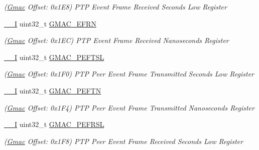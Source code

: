 \begin{DoxyCompactItemize}
\begin{DoxyCompactList}\small\item\em (\mbox{\hyperlink{structGmac}{Gmac}} Offset\+: 0x1\+E8) P\+TP Event Frame Received Seconds Low Register \end{DoxyCompactList}\item 
\mbox{\label{structGmac_a8b25b027a206d3d56ae3e32079a1b18f}} 
\mbox{\hyperlink{core__cm7_8h_af63697ed9952cc71e1225efe205f6cd3}{\+\_\+\+\_\+I}} uint32\+\_\+t \mbox{\hyperlink{structGmac_a8b25b027a206d3d56ae3e32079a1b18f}{G\+M\+A\+C\+\_\+\+E\+F\+RN}}
\begin{DoxyCompactList}\small\item\em (\mbox{\hyperlink{structGmac}{Gmac}} Offset\+: 0x1\+EC) P\+TP Event Frame Received Nanoseconds Register \end{DoxyCompactList}\item 
\mbox{\label{structGmac_a212ed4d07957cad7923c9a79aa84df51}} 
\mbox{\hyperlink{core__cm7_8h_af63697ed9952cc71e1225efe205f6cd3}{\+\_\+\+\_\+I}} uint32\+\_\+t \mbox{\hyperlink{structGmac_a212ed4d07957cad7923c9a79aa84df51}{G\+M\+A\+C\+\_\+\+P\+E\+F\+T\+SL}}
\begin{DoxyCompactList}\small\item\em (\mbox{\hyperlink{structGmac}{Gmac}} Offset\+: 0x1\+F0) P\+TP Peer Event Frame Transmitted Seconds Low Register \end{DoxyCompactList}\item 
\mbox{\label{structGmac_a4e28c5644dac1d89b934530f1f7a21c3}} 
\mbox{\hyperlink{core__cm7_8h_af63697ed9952cc71e1225efe205f6cd3}{\+\_\+\+\_\+I}} uint32\+\_\+t \mbox{\hyperlink{structGmac_a4e28c5644dac1d89b934530f1f7a21c3}{G\+M\+A\+C\+\_\+\+P\+E\+F\+TN}}
\begin{DoxyCompactList}\small\item\em (\mbox{\hyperlink{structGmac}{Gmac}} Offset\+: 0x1\+F4) P\+TP Peer Event Frame Transmitted Nanoseconds Register \end{DoxyCompactList}\item 
\mbox{\label{structGmac_a82d0e4dd9eddf1a36ea0af5908d07a3e}} 
\mbox{\hyperlink{core__cm7_8h_af63697ed9952cc71e1225efe205f6cd3}{\+\_\+\+\_\+I}} uint32\+\_\+t \mbox{\hyperlink{structGmac_a82d0e4dd9eddf1a36ea0af5908d07a3e}{G\+M\+A\+C\+\_\+\+P\+E\+F\+R\+SL}}
\begin{DoxyCompactList}\small\item\em (\mbox{\hyperlink{structGmac}{Gmac}} Offset\+: 0x1\+F8) P\+TP Peer Event Frame Received Seconds Low Register \end{DoxyCompactList}\item 

\end{DoxyCompactItemize}
